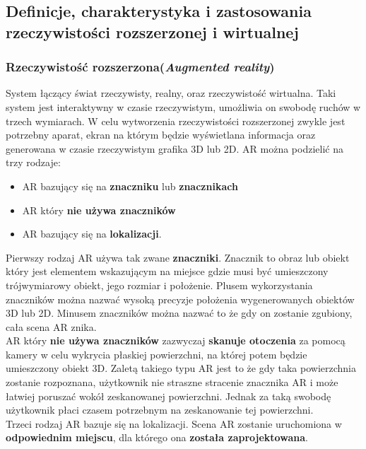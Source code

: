 \subsection{Definicje, charakterystyka i zastosowania rzeczywistości rozszerzonej i wirtualnej}

\subsubsection{Rzeczywistość rozszerzona(\textit{Augmented reality})}

System łączący świat rzeczywisty, realny, oraz rzeczywistość wirtualna. Taki system jest interaktywny w czasie rzeczywistym, umożliwia on swobodę ruchów w trzech wymiarach. W celu wytworzenia rzeczywistości rozszerzonej zwykle jest potrzebny aparat, ekran na którym będzie wyświetlana informacja oraz generowana w czasie rzeczywistym grafika 3D lub 2D. AR można podzielić na trzy rodzaje: 

\begin{itemize}
	\item AR bazujący się na \textbf{znaczniku} lub \textbf{znacznikach} 
	\item AR który \textbf{nie używa znaczników }
	\item AR bazujący się na \textbf{lokalizacji}. \\
\end{itemize}

Pierwszy rodzaj AR używa tak zwane \textbf{znaczniki}. Znacznik to obraz lub obiekt który jest elementem wskazującym na miejsce gdzie musi być umieszczony trójwymiarowy obiekt, jego rozmiar i położenie. Plusem wykorzystania znaczników można nazwać wysoką precyzje położenia wygenerowanych obiektów 3D lub 2D. Minusem znaczników można nazwać to że gdy on zostanie zgubiony, cała scena AR znika. \\

AR który \textbf{nie używa znaczników} zazwyczaj \textbf{skanuje otoczenia} za pomocą kamery w celu wykrycia płaskiej powierzchni, na której potem będzie umieszczony obiekt 3D. Zaletą takiego typu AR jest to że gdy taka powierzchnia zostanie rozpoznana, użytkownik nie straszne stracenie znacznika AR i może łatwiej poruszać wokół zeskanowanej powierzchni. Jednak za taką swobodę użytkownik płaci czasem potrzebnym na zeskanowanie tej powierzchni. \\
 
Trzeci rodzaj AR bazuje się na lokalizacji. Scena AR zostanie uruchomiona w \textbf{odpowiednim miejscu}, dla którego ona \textbf{została zaprojektowana}. \\


